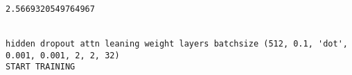 \documentclass[11pt]{article}
\begin{document}
    \begin{center}
    \end{center}
    { \hspace*{\fill} \\}
    
    \begin{center}
    \end{center}
    { \hspace*{\fill} \\}
    
    \begin{Verbatim}[commandchars=\\\{\}]
2.5669320549764967


hidden dropout attn leaning weight layers batchsize (512, 0.1, 'dot', 0.001, 0.001, 2, 2, 32)
START TRAINING



    \end{Verbatim}

    \begin{center}
    \end{center}
    { \hspace*{\fill} \\}
    
    \begin{center}
    \end{center}
    { \hspace*{\fill} \\}
    
    \begin{center}
    \end{center}
    { \hspace*{\fill} \\}
    
    \begin{center}
    \end{center}
    { \hspace*{\fill} \\}
    
    \begin{center}
    \end{center}
    { \hspace*{\fill} \\}
    
\end{document}
